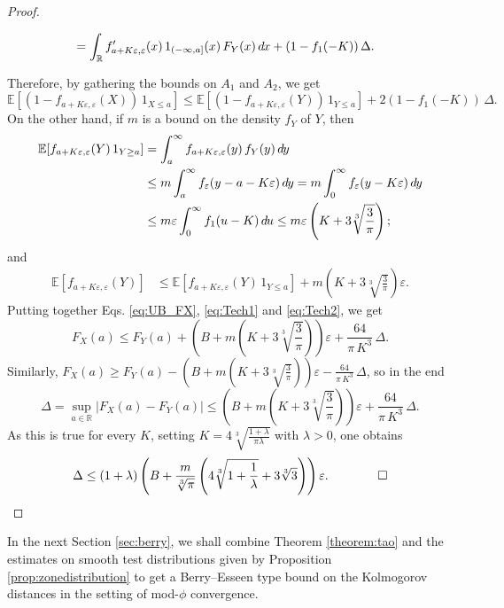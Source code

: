 \documentclass[envcountsame]{svmult}
\newcommand{\R}{\mathbb{R}}
\newcommand{\esper}{\mathbb{E}}
\newcommand{\eps}{\varepsilon}
\newcommand{\DD}[1]{\,d\hspace*{-0.3mm}{#1}}
\begin{document}
\begin{proof}
\begin{itemize}
\begin{align*}
&=\int_{\R} f_{a+K\eps,\eps}'(x)\,1_{(-\infty,a]}(x)\, F_Y(x)\DD{x} + (1-f_{1}(-K))\,\Delta.
\end{align*}
\end{itemize}
Therefore, by gathering the bounds on $A_1$ and $A_2$, we get
\begin{equation}
  \esper[(1-f_{a+K\eps,\eps}(X))\,1_{X \leq a}]\leq \esper[(1-f_{a+K\eps,\eps}(Y))\,1_{Y \leq a}]+2 (1-f_1(-K))\,\Delta.
  \label{eq:Tech1}
\end{equation}
On the other hand, if $m$ is a bound on the density $f_Y$ of $Y$, then
\begin{align*}\esper[f_{a+K\eps,\eps}(Y)\,1_{Y \geq a}] &= \int_a^{\infty} f_{a+K\eps,\eps}(y)\,f_Y(y)\DD{y}\\
&\leq m\int_{a}^\infty f_{\eps}(y-a-K\eps)\DD{y} = m\int_0^\infty f_\eps(y-K\eps)\DD{y}\\\
&\leq m\eps \int_0^\infty f_1(u-K)\DD{u} \leq m \eps \left(K+3\sqrt[3]{\frac{3}{\pi}}\right);\end{align*}
and
\begin{align}
\esper[f_{a+K\eps,\eps}(Y)] &\leq \esper[f_{a+K\eps,\eps}(Y)\,1_{Y \leq a}] + m\left(K+3\sqrt[3]{\frac{3}{\pi}}\right)\eps.
\label{eq:Tech2}
\end{align}
Putting together Eqs. \eqref{eq:UB_FX}, \eqref{eq:Tech1} and \eqref{eq:Tech2}, we get
\[
F_X(a) \leq F_Y(a) + \left(B+m\left(K+3\sqrt[3]{\frac{3}{\pi}}\right)\right) \eps + \frac{64}{\pi\,K^3}\,\Delta.
\]
Similarly, $F_X(a)\geq F_Y(a) - \left(B+m(K+3\sqrt[3]{\frac{3}{\pi}})\right) \eps - \frac{64}{\pi\,K^3}\,\Delta$, so in the end
$$\Delta = \sup_{a \in \R}|F_X(a)-F_Y(a)| \leq \left(B+m\left(K+3\sqrt[3]{\frac{3}{\pi}}\right)\right)\eps + \frac{64}{\pi\,K^3}\,\Delta.$$
As this is true for every $K$, setting $K=4\sqrt[3]{\frac{1+\lambda}{\pi\lambda}}$ with $\lambda>0$, one obtains
\begin{equation*}
\Delta \leq (1+\lambda)\left(B+\frac{m}{\sqrt[3]{\pi}}\left(4\sqrt[3]{1+\frac{1}{\lambda}}+3\sqrt[3]{3}\right)\right)\eps.\qquad\qed
\end{equation*}
\end{proof}
\medskip

In the next Section \ref{sec:berry}, we shall combine Theorem \ref{theorem:tao} and the estimates on smooth test distributions given by Proposition \ref{prop:zonedistribution} to get a Berry--Esseen type bound on the Kolmogorov distances in the setting of mod-$\phi$ convergence.
\end{document}
